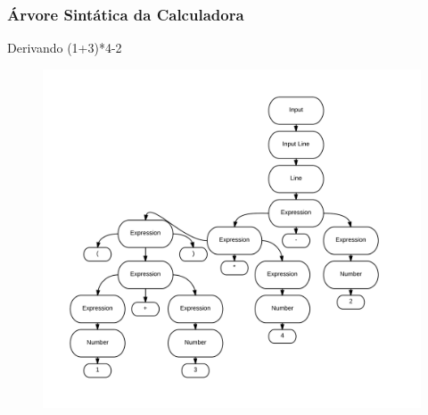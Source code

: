 \documentclass{beamer}
\begin{document}
\begin {frame}
\frametitle{Árvore Sintática da Calculadora }
Derivando (1+3)*4-2

\begin{figure} 	%
            \centering		%
            \includegraphics[scale=0.1]{5.png} %
            \end{figure} 

\end{frame}
\end{document}
